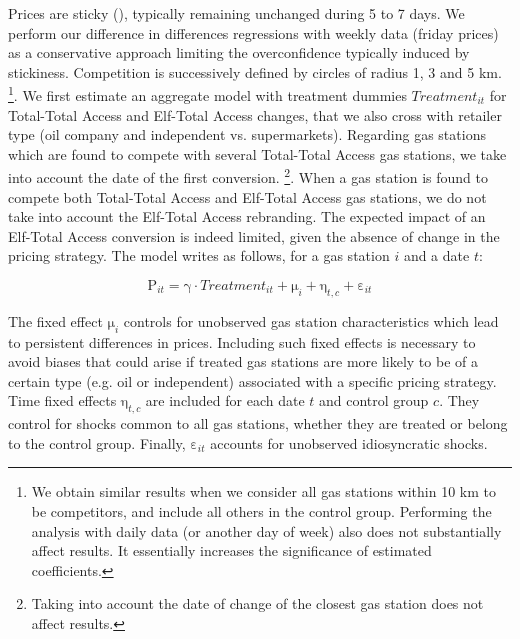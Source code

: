\documentclass[english]{article}
\begin{document}
Prices are sticky (\cite{GAU15}), typically remaining unchanged during 5 to 7 days. We perform our difference in differences regressions with weekly data (friday prices) as a conservative approach 
limiting the overconfidence typically induced by stickiness. Competition is successively defined by circles of radius 1, 3 and 5 km.%
\footnote{We obtain similar results when we consider all gas stations within 10 km to be competitors, and include all others in the control group. Performing the analysis with daily data (or another day of week) 
also does not substantially affect results. It essentially increases the significance of estimated coefficients.%
}. We first estimate an aggregate model with treatment dummies $Treatment_{it}$ for Total-Total Access and Elf-Total Access changes, that we also cross with retailer type (oil company and independent vs. supermarkets). Regarding gas stations which are found to compete with several Total-Total Access gas stations, we take into account the date of the first conversion.%
\footnote{Taking into account the date of change of the closest gas station does not affect results.%
}. When a gas station is found to compete both Total-Total Access and Elf-Total Access gas stations, we do not take into account the Elf-Total Access rebranding. The expected impact of an Elf-Total Access conversion is indeed limited, given the absence of change in the pricing strategy. The model writes as follows, for a gas station $i$ and a date $t$:

\begin{equation}
\mathrm{P}_{it}=\mathrm{\gamma}\cdot Treatment_{it}+\mathrm{\mu}_{i}+\mathrm{\eta}_{t,c}+\mathrm{\varepsilon}_{it}\label{eq:1}
\end{equation}

\medskip{}

The fixed effect $\mathrm{\mu}_{i}$ controls for unobserved gas station characteristics which lead to persistent differences in prices. Including such fixed effects is necessary to avoid biases that could arise if treated gas stations are more likely to be of a certain type (e.g. oil or independent) associated with a specific pricing strategy. Time fixed effects $\mathrm{\eta}_{t,c}$ are included for each date $t$ and control group $c$. They control for shocks common to all gas stations, whether they are treated or belong to the control group. Finally, $\mathrm{\varepsilon}_{it}$ accounts for unobserved idiosyncratic shocks.
\medskip{}
\end{document}
